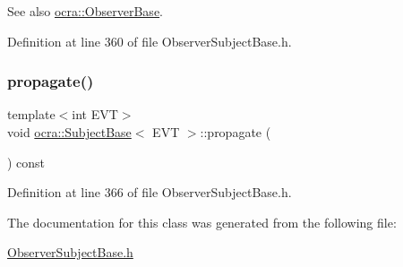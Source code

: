 \begin{DoxySeeAlso}{See also}
\hyperlink{classocra_1_1ObserverBase}{ocra\+::\+Observer\+Base}. 
\end{DoxySeeAlso}


Definition at line 360 of file Observer\+Subject\+Base.\+h.

\hypertarget{classocra_1_1SubjectBase_ac1ea6ef128938185c89519913da5b063}{}\label{classocra_1_1SubjectBase_ac1ea6ef128938185c89519913da5b063} 
\subsubsection{\texorpdfstring{propagate()}{propagate()}\hspace{0.1cm}{\footnotesize\ttfamily [2/2]}}
{\footnotesize\ttfamily template$<$int E\+VT$>$ \\
void \hyperlink{classocra_1_1SubjectBase}{ocra\+::\+Subject\+Base}$<$ E\+VT $>$\+::propagate (\begin{DoxyParamCaption}{ }\end{DoxyParamCaption}) const\hspace{0.3cm}{\ttfamily [inline]}}



Definition at line 366 of file Observer\+Subject\+Base.\+h.



The documentation for this class was generated from the following file\+:\begin{DoxyCompactItemize}
\item 
\hyperlink{ObserverSubjectBase_8h}{Observer\+Subject\+Base.\+h}\end{DoxyCompactItemize}
